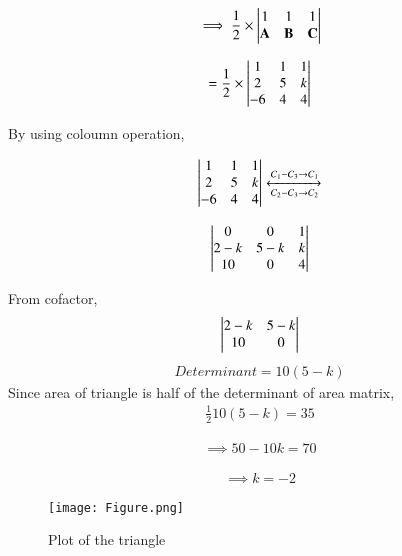 \documentclass[journal,12pt,twocolumn]{IEEEtran}
\begin{document}
\begin{align}
   \implies  \frac12 \times  \begin{vmatrix}1 & 1 & 1  \\ 
\mathbf{A} & \mathbf{B} & \mathbf{C}\end{vmatrix}
\end{align}

\begin{align}
=  \frac12 \times  \begin{vmatrix}1 & 1 & 1  \\ 
 2 & 5 & k \\ 
-6 & 4 & 4\end{vmatrix}
\end{align}

 By using coloumn operation,

\begin{align}
   \begin{vmatrix}1 & 1 & 1  \\ 
 2 & 5 & k \\ 
-6 & 4 & 4\end{vmatrix}
\xleftrightarrow [C_2-C_3\rightarrow C_2]{C_1-C_3\rightarrow C_1}
\end{align}

\begin{align}
 \begin{vmatrix}0 & 0 & 1  \\ 
 2-k & 5-k & k \\ 
10 & 0 & 4\end{vmatrix}
\end{align}

From cofactor, 
\begin{align}
     \begin{vmatrix}2-k & 5-k \\ 
10 & 0 \end{vmatrix}
\end{align}
\begin{align}
 Determinant = 10(5-k)
\end{align}
Since area of triangle is half of the determinant of area matrix,
\begin{align}
   \frac{1}{2}10(5-k) = 35
\end{align}

\begin{align}
   \implies 50-10k = 70
\end{align}

\begin{align}
  \implies  k = -2
\end{align}
\begin{figure}[!h]
         \centering
         \texttt{[image: Figure.png]}
         \caption{Plot of the triangle}
         \label{Figure}
\end{figure}
\end{document}
